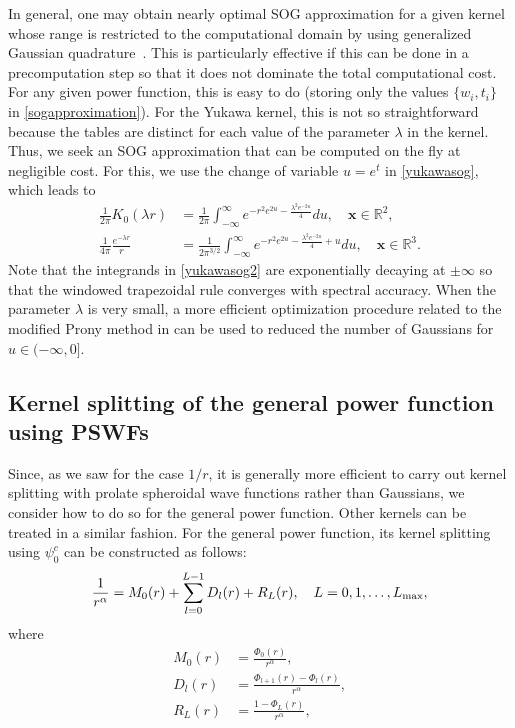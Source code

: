 \documentclass[final,letterpaper]{siamart171218}
\newcommand{\be}{\begin{equation}}
\newcommand{\ee}{\end{equation}}
\newcommand{\ba}{\begin{aligned}}
\newcommand{\ea}{\end{aligned}}
\newcommand{\x}{\boldsymbol{x}}
\newcommand{\psic}{{\psi_0^c}}
\begin{document}
In general, one may obtain nearly optimal SOG approximation for a given kernel
whose range is restricted to the computational domain by using generalized 
Gaussian quadrature~\cite{ggq1,ggq2,ggq3}. This is particularly effective if
this can be done in a precomputation step so that it does not dominate the total
computational cost. For any given power function, this is easy to do (storing
only the values $\{ w_i, t_i \}$ in \eqref{sogapproximation}).
For the Yukawa kernel, this is not so straightforward because the tables are distinct
for each value of the parameter $\lambda$ in the kernel. 
Thus, we seek an SOG approximation that can be computed 
on the fly at negligible cost. For this, we use the
change of variable $u=e^t$ in \cref{yukawasog}, which leads to
\be\label{yukawasog2}
\ba
\frac{1}{2\pi} K_0(\lambda r)
& = \frac{1}{2\pi}\int_{-\infty}^\infty e^{-r^2e^{2u}-\frac{\lambda^2e^{-2u}}{4}}du,
\quad \x\in\mathbb{R}^2,\\
\frac{1}{4\pi} \frac{e^{-\lambda r}}{r}
& = \frac{1}{2\pi^{3/2}}\int_{-\infty}^\infty e^{-r^2e^{2u}-\frac{\lambda^2e^{-2u}}{4}+u}du,
\quad \x\in\mathbb{R}^3.
\ea
\ee
Note that the integrands in \cref{yukawasog2} are exponentially decaying at
$\pm\infty$ so that the windowed trapezoidal rule converges with spectral accuracy.
When the parameter $\lambda$ is very small, a more efficient optimization procedure related
to the modified Prony method in \cite{beylkin2010acha} can be used to reduced the 
number of Gaussians for $u \in (-\infty,0]$.

\subsection{Kernel splitting of the general power function using PSWFs} 

Since, as we saw for the case $1/r$, it is generally more efficient to carry out kernel
splitting with prolate spheroidal wave functions rather than Gaussians, we consider
how to do so for the general power function. Other kernels can be treated in a similar fashion.
For the general power function, its kernel splitting using $\psic$ can be constructed
as follows:
\be\label{powerfunctionpswfsplitting}
\frac{1}{r^\alpha}  = M_0(r) + \sum_{l=0}^{L-1} D_l(r) + R_L(r), \quad L=0, 1, \ldots, L_{\rm max},
\ee
where
\be\label{powerfunctionkernels}
\ba
M_0(r) &= \frac{\Phi_0(r)}{r^\alpha},\\
D_l(r) &=\frac{\Phi_{l+1}(r)-\Phi_{l}(r)}{r^\alpha},\\
R_L(r) &=\frac{1-\Phi_L(r)}{r^\alpha},
\ea
\ee
\end{document}

